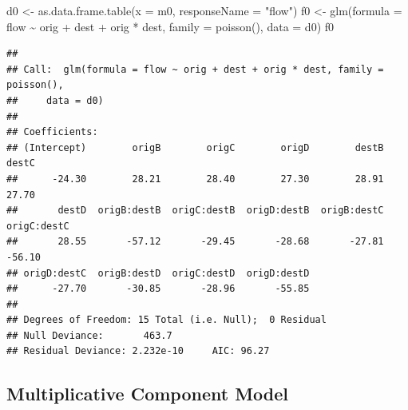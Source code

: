 \documentclass[
]{book}
\newenvironment{Shaded}{\begin{snugshade}}{\end{snugshade}}
\newcommand{\AttributeTok}[1]{\textcolor[rgb]{0.77,0.63,0.00}{#1}}
\newcommand{\CommentTok}[1]{\textcolor[rgb]{0.56,0.35,0.01}{\textit{#1}}}
\newcommand{\DecValTok}[1]{\textcolor[rgb]{0.00,0.00,0.81}{#1}}
\newcommand{\FunctionTok}[1]{\textcolor[rgb]{0.00,0.00,0.00}{#1}}
\newcommand{\NormalTok}[1]{#1}
\newcommand{\OtherTok}[1]{\textcolor[rgb]{0.56,0.35,0.01}{#1}}
\newcommand{\SpecialCharTok}[1]{\textcolor[rgb]{0.00,0.00,0.00}{#1}}
\newcommand{\StringTok}[1]{\textcolor[rgb]{0.31,0.60,0.02}{#1}}
\begin{document}
\begin{Shaded}
\begin{Highlighting}[]
\NormalTok{d0 }\OtherTok{\textless{}{-}} \FunctionTok{as.data.frame.table}\NormalTok{(}\AttributeTok{x =}\NormalTok{ m0, }\AttributeTok{responseName =} \StringTok{"flow"}\NormalTok{)}
\NormalTok{f0 }\OtherTok{\textless{}{-}} \FunctionTok{glm}\NormalTok{(}\AttributeTok{formula =}\NormalTok{ flow }\SpecialCharTok{\textasciitilde{}}\NormalTok{ orig }\SpecialCharTok{+}\NormalTok{ dest }\SpecialCharTok{+}\NormalTok{ orig }\SpecialCharTok{*}\NormalTok{ dest, }\AttributeTok{family =} \FunctionTok{poisson}\NormalTok{(), }
           \AttributeTok{data =}\NormalTok{ d0)}
\NormalTok{f0}
\end{Highlighting}
\end{Shaded}

\begin{verbatim}
## 
## Call:  glm(formula = flow ~ orig + dest + orig * dest, family = poisson(), 
##     data = d0)
## 
## Coefficients:
## (Intercept)        origB        origC        origD        destB        destC  
##      -24.30        28.21        28.40        27.30        28.91        27.70  
##       destD  origB:destB  origC:destB  origD:destB  origB:destC  origC:destC  
##       28.55       -57.12       -29.45       -28.68       -27.81       -56.10  
## origD:destC  origB:destD  origC:destD  origD:destD  
##      -27.70       -30.85       -28.96       -55.85  
## 
## Degrees of Freedom: 15 Total (i.e. Null);  0 Residual
## Null Deviance:       463.7 
## Residual Deviance: 2.232e-10     AIC: 96.27
\end{verbatim}

\hypertarget{multiplicative-component-model-6}{%
\subsection{Multiplicative Component Model}\label{multiplicative-component-model-6}}

\begin{Shaded}
\end{Shaded}
\end{document}
